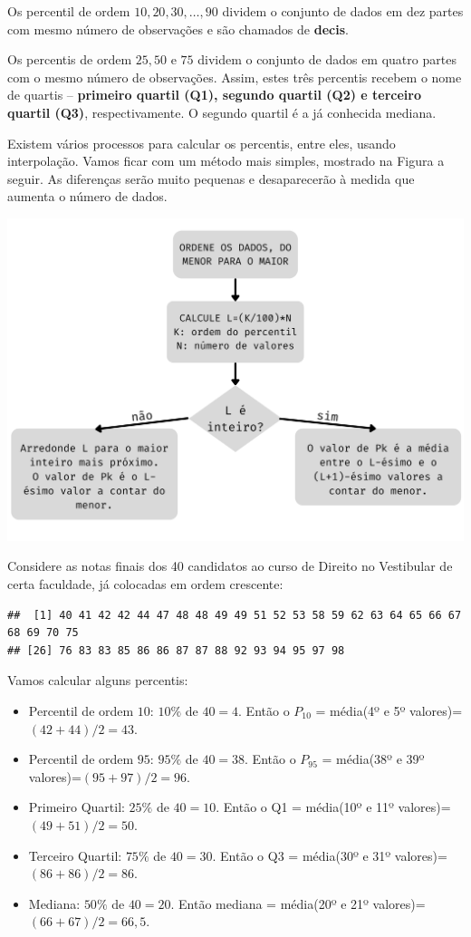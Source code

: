 \documentclass[
]{book}
\begin{document}
Os percentil de ordem \(10,20,30,\ldots,90\) dividem o conjunto de dados em dez partes com mesmo número de observações e são chamados de \textbf{decis}.

Os percentis de ordem \(25,50\) e \(75\) dividem o conjunto de dados em quatro partes com o mesmo número de observações. Assim, estes três percentis recebem o nome de quartis -- \textbf{primeiro quartil (Q1), segundo quartil (Q2) e terceiro quartil (Q3)}, respectivamente. O segundo quartil é a já conhecida mediana.

Existem vários processos para calcular os percentis, entre eles, usando interpolação. Vamos ficar com um método mais simples, mostrado na Figura a seguir. As diferenças serão muito pequenas e desaparecerão à medida que aumenta o número de dados.

\includegraphics{fluxograma_percentil.png}

Considere as notas finais dos 40 candidatos ao curso de Direito no Vestibular de certa faculdade, já colocadas em ordem crescente:

\begin{verbatim}
##  [1] 40 41 42 42 44 47 48 48 49 49 51 52 53 58 59 62 63 64 65 66 67 68 69 70 75
## [26] 76 83 83 85 86 86 87 87 88 92 93 94 95 97 98
\end{verbatim}

Vamos calcular alguns percentis:

\begin{itemize}
\item
  Percentil de ordem \(10\): \(10\%\) de \(40=4\). Então o \(P_10\) = média(4º e 5º valores)=\((42+44)/2=43\).
\item
  Percentil de ordem \(95\): \(95\%\) de \(40=38\). Então o \(P_95\) = média(38º e 39º valores)=\((95+97)/2=96\).
\item
  Primeiro Quartil: \(25\%\) de \(40=10\). Então o Q1 = média(10º e 11º valores)=\((49+51)/2 = 50\).
\item
  Terceiro Quartil: \(75\%\) de \(40=30\). Então o Q3 = média(30º e 31º valores)=\((86+86)/2 = 86\).
\item
  Mediana: \(50\%\) de \(40=20\). Então mediana = média(20º e 21º valores)=\((66+67)/2 = 66,5\).
\end{itemize}
\end{document}
